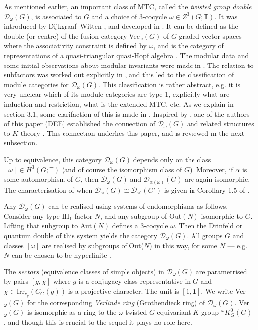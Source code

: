 \documentclass[12pt]{article}
\numberwithin{equation}{section}
\def\cD            {{\mathcal{D}}}
\def\bbT           {\mathbb{T}}
\begin{document}
As mentioned earlier,
an important class  of MTC, called the \textit{twisted group double} $\cD_\omega(G)$, is associated to $G$ and a choice of 
3-cocycle $\omega\in Z^3(G;\bbT)$. It was introduced by Dijkgraaf--Witten \cite{DW}, 
and developed in \cite{DPR}. It can be defined as the double (or centre)  of the fusion category Vec$_\omega(G)$
of $G$-graded vector spaces where the associativity constraint is defined by $\omega$, and is the category of representations of a quasi-triangular quasi-Hopf algebra \cite{Maj}. The modular data
and some initial observations about modular invariants were made in \cite{CGR}. The relation to subfactors was worked out explicitly in \cite{EP1}, and this led to the   classification  \cite{Ost} of module categories for
$\cD_\omega(G)$. This classification is rather abstract, e.g. it is very unclear which of its module categories are type 1, explicitly what are induction and restriction, what is the extended MTC, etc. As we explain in section 3.1, some clarifaction of this is made in \cite{Dav,Dav3}. Inspired by \cite{FHT}, one of the authors of this paper (DEE) established the connection of $\cD_\omega(G)$ and related structures to $K$-theory \cite{Ev}. This connection underlies this paper, and is reviewed in the next subsection.

Up to equivalence, this category $\cD_\omega(G)$ depends  only on the class $[\omega]\in H^3(G;\bbT)$ {(and of course the isomorphism class of $G$)}. Moreover, if $\alpha$ is some automorphism of $G$, then $\cD_\omega(G)$ and $\cD_{\alpha(\omega)}(G)$ are again isomorphic. The characterisation of when $\cD_\omega(G)\cong\cD_{\omega'}(G')$ is given in Corollary 1.5 of \cite{NN}. 


Any $\cD_\omega(G)$ can be realised using systems of endomorphisms as follows. 
Consider any type III$_1$ factor $N$, and any subgroup of Out$(N)$ isomorphic
to $G$. Lifting that subgroup to Aut$(N)$ defines a 3-cocycle $\omega$. Then the Drinfeld or quantum double of this system  yields {the category} $\cD_\omega(G)$.
All groups $G$ and classes $[\omega]$ are realised by subgroups of Out($N$) in this way, for some $N$ --- e.g.\ $N$ can be chosen to be hyperfinite \cite{Jon1}.

 
The \textit{sectors} (equivalence classes of simple objects) in $\cD_\omega(G)$   are parametrised by pairs $[g,\chi]$ where $g$ is a  conjugacy class representative in $G$ and 
$\chi\in \mathrm{Irr}_{c_g}(C_G(g))$ is a projective character.
The unit  is $[1,\mathbf{1}]$. We write Ver$_\omega(G)$ for the corresponding \textit{Verlinde ring}  (Grothendieck ring) of $\cD_\omega(G)$. Ver$_\omega(G)$ is isomorphic as a ring to  the $\omega$-twisted
$G$-equivariant $K$-group ${}^\omega K^0_G(G)$, and though this is crucial to the sequel \cite{EG8} it plays no role here.
\end{document}
